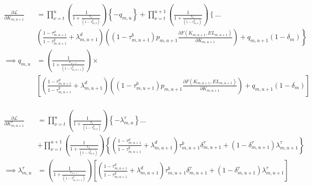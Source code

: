 \documentclass[letterpaper,12pt]{article}
\theoremstyle{definition}
\begin{document}
\begin{spacing}{1.5}
\begin{equation}
\label{eqn:lagrange_foc_k_tax}
\begin{split}
 \frac{\partial \mathcal{L}}{\partial K_{m,u+1}} & =   \prod_{\nu=t}^{u} \left(\frac{1}{1+\frac{r_{\nu}}{(1-\tau^{g}_{m,\nu})}}\right) \left\{-q_{m,u} \right\}  +  \prod_{\nu=t}^{u+1} \left(\frac{1}{1+\frac{r_{\nu}}{(1-\tau^{g}_{m,\nu})}}\right) \left\{ ... \right. \\
 & \left. \left(\frac{1-\tau^{d}_{m,u+1}}{1-\tau^{g}_{m,u+1}}+\lambda^{d}_{m,u+1}\right)\left((1-\tau^{b}_{m,u+1})p_{m,u+1}\frac{\partial F(K_{m,u+1},EL_{m,u+1})}{\partial K_{m,u+1}}\right) + q_{m,u+1}(1-\delta_{m}) \right\} \\
\implies  q_{m,u} &=  \left(\frac{1}{1+\frac{r_{u+1}}{(1-\tau^{g}_{m,u+1})}}\right) \times  \\
& \left[\left(\frac{1-\tau^{d}_{m,u+1}}{1-\tau^{g}_{m,u+1}}+\lambda^{d}_{m,u+1}\right)\left((1-\tau^{b}_{m,u+1})p_{m,u+1}\frac{\partial F(K_{m,u+1},EL_{m,u+1})}{\partial K_{m,u+1}}\right) + q_{m,u+1}(1-\delta_{m}) \right]  \\
\end{split}
\end{equation}

\begin{equation}
\label{eqn:lagrange_foc_ktau_tax}
\begin{split}
 \frac{\partial \mathcal{L}}{\partial K^{\tau}_{m,u+1}} &=    \prod_{\nu=t}^{u} \left(\frac{1}{1+\frac{r_{\nu}}{(1-\tau^{g}_{m,\nu})}}\right) \left\{-\lambda^{\tau}_{m,u} \right\} ... \\
 & +  \prod_{\nu=t}^{u+1} \left(\frac{1}{1+\frac{r_{\nu}}{(1-\tau^{g}_{m,\nu})}}\right) \left\{ \left(\frac{1-\tau^{d}_{m,u+1}}{1-\tau^{g}_{m,u+1}}+\lambda^{d}_{m,u+1}\right)\tau^{b}_{m,u+1}\delta^{\tau}_{m,u+1} + (1-\delta^{\tau}_{m,u+1})\lambda^{\tau}_{m,u+1} \right\} \\
\implies \lambda^{\tau}_{m,u} &=  \left(\frac{1}{1+\frac{r_{u+1}}{(1-\tau^{g}_{m,u+1})}}\right) \left[ \left(\frac{1-\tau^{d}_{m,u+1}}{1-\tau^{g}_{m,u+1}}+\lambda^{d}_{m,u+1}\right)\tau^{b}_{m,u+1}\delta^{\tau}_{m,u+1} + (1-\delta^{\tau}_{m,u+1})\lambda^{\tau}_{m,u+1} \right]  \\
\end{split}
\end{equation}


\end{spacing}
\end{document}
